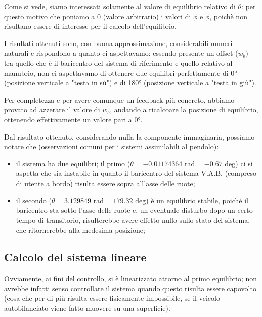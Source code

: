 Come si vede, siamo interessati solamente al valore di equilibrio relativo di $\theta$: per questo motivo che poniamo a 0 (valore arbitrario) i valori di $\phi$ e $\dot{\phi}$, poichè non risultano essere di interesse per il calcolo dell'equilibrio.

I risultati ottenuti sono, con buona approssimazione, considerabili numeri naturali e rispondono a quanto ci aspettavamo: essendo presente un offset ($w_b$) tra quello che è il baricentro del sistema di riferimento e quello relativo al manubrio, non ci aspettavamo di ottenere due equilibri perfettamente di 0° (posizione verticale a "testa in sù") e di 180° (posizione verticale a "testa in giù").

Per completezza e per avere comunque un feedback più concreto, abbiamo provato ad azzerare il valore di $w_b$, andando a ricalcoare la posizione di equilibrio, ottenendo effettivamente un valore pari a 0°.

Dal risultato ottenuto, considerando nulla la componente immaginaria, possiamo notare che (osservazioni comuni per i sistemi assimilabili al pendolo):

\begin{itemize}
	\item il sistema ha due equilibri; il primo ($\theta = -0.01174364 \text{ rad} = -0.67 \text{ deg}$) ci si aspetta che sia instabile in quanto il baricentro del sistema V.A.B. (compreso di utente a bordo) risulta essere sopra all'asse delle ruote;
	\item il secondo ($\theta = 3.129849 \text{ rad} = 179.32 \text{ deg}$) è un equilibrio stabile, poiché il baricentro sta sotto l'asse delle ruote e, un eventuale disturbo dopo un certo tempo di transitorio, risulterebbe avere effetto nullo sullo stato del sistema, che ritornerebbe alla medesima posizione;
\end{itemize}

\subsection{Calcolo del sistema lineare}
Ovviamente, ai fini del controllo, si è linearizzato attorno al primo equilibrio; non avrebbe infatti senso controllare il sistema quando questo risulta essere capovolto (cosa che per di più risulta essere fisicamente impossibile, se il veicolo autobilanciato viene fatto muovere su una superficie).

